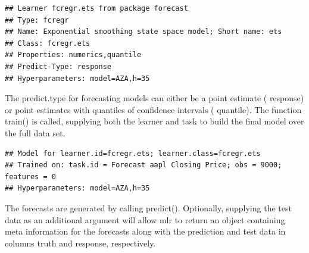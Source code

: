 \documentclass[12pt]{article}%
\makeatletter
\theoremstyle{definition}
\newcommand\code{\@codex}
\def\@codex#1{{\normalfont\ttfamily\hyphenchar\font=-1 #1}}
\newcommand{\pkg}[1]{{\fontseries{b}\selectfont #1}}
\makeatother
\begin{document}
\singlespacing
\begin{knitrout}
\color{fgcolor}\begin{kframe}
\begin{alltt}
 \hlkwb{=}\hlstd{(} \hlstd{=} \hlstd{,}  \hlstd{=} \hlstd{,}
                      \hlstd{=} \hlstd{,}  \hlstd{=} \hlstd{)}
\end{alltt}
\begin{verbatim}
## Learner fcregr.ets from package forecast
## Type: fcregr
## Name: Exponential smoothing state space model; Short name: ets
## Class: fcregr.ets
## Properties: numerics,quantile
## Predict-Type: response
## Hyperparameters: model=AZA,h=35
\end{verbatim}
\end{kframe}
\end{knitrout}
\doublespacing

The \code{predict.type} for forecasting models can either be a point estimate (\code{response}) or point estimates with quantiles of confidence intervals (\code{quantile}). The function \code{train()} is called, supplying both the learner and task to build the final model over the full data set.

\singlespace
\begin{knitrout}
\color{fgcolor}\begin{kframe}
\begin{alltt}
 \hlkwb{=} \hlstd{(}   
\end{alltt}
\begin{verbatim}
## Model for learner.id=fcregr.ets; learner.class=fcregr.ets
## Trained on: task.id = Forecast aapl Closing Price; obs = 9000; features = 0
## Hyperparameters: model=AZA,h=35
\end{verbatim}
\end{kframe}
\end{knitrout}
\doublespace

The forecasts are generated by calling \code{predict()}. Optionally, supplying the test data as an additional argument will allow \pkg{mlr} to return an object containing meta information for the forecasts along with the prediction and test data in columns \code{truth} and \code{response}, respectively.
\end{document}
